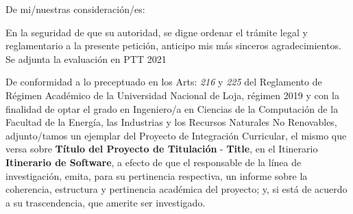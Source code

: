 \documentclass[12pt,a4paper,sans]{moderncv}
\newcommand{\titulo}{Título del Proyecto de Titulación}
\newcommand{\tituloEng}{Title}
\newcommand{\lineaInv}{Itinerario de Software}
\begin{document}
\date{Loja, 23 de marzo del 2021}
\opening{De mi/nuestras consideración/es:}
\closing{En la seguridad de que su autoridad, se digne ordenar el trámite legal y reglamentario a la presente petición, anticipo mis más sinceros agradecimientos. Se adjunta la evaluación en PTT 2021}
\makelettertitle

De conformidad a lo preceptuado en los Arts: \textit{216} y \textit{225} del Reglamento de Régimen Académico de la Universidad Nacional de Loja, régimen 2019 y con la finalidad de optar el grado en Ingeniero/a en Ciencias de la Computación de la Facultad de la Energía, las Industrias y los Recursos Naturales No Renovables, adjunto/tamos un ejemplar del Proyecto de Integración Curricular, el mismo que versa sobre \textbf{\titulo} - \textbf{\tituloEng}, en el Itinerario \textbf{\lineaInv}, a efecto de que el responsable de la línea de investigación, emita, para su pertinencia respectiva, un informe sobre la coherencia, estructura y pertinencia académica del proyecto; y, si está de acuerdo a su trascendencia, que amerite ser investigado.

\makeletterclosing
\end{document}
